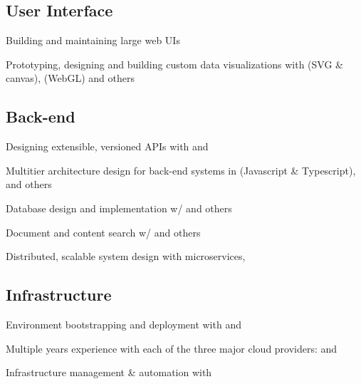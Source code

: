\documentclass[11.5pt]{article}
\begin{document}
\begin{multicols}{2}
\raggedcolumns

\subsection*{User Interface}
\vspace{0.25in}
\begin{itemize*}
  \setlength\itemsep{0.4em}
  \item Building and maintaining large  web UIs
  \item Prototyping, designing and building custom data visualizations with  (SVG \& canvas),  (WebGL) and others
\end{itemize*}

\subsection*{Back-end}
\vspace{0.25in}
\begin{itemize*}
  \setlength\itemsep{0.4em}
  \item Designing extensible, versioned APIs with  and 
  \item Multitier architecture design for back-end systems in    (Javascript \& Typescript),  and others
  \item Database design and implementation w/    and others
  \item Document and content search w/   and others
  \item Distributed, scalable system design with microservices,  
\end{itemize*}

\subsection*{Infrastructure}
\vspace{0.25in}
\begin{itemize*}
  \setlength\itemsep{0.4em}
  \item Environment bootstrapping and deployment with  and 
  \item Multiple years experience with each of the three major cloud providers:   and 
  \item Infrastructure management \& automation with 
\end{itemize*}


\end{multicols}
\end{document}
